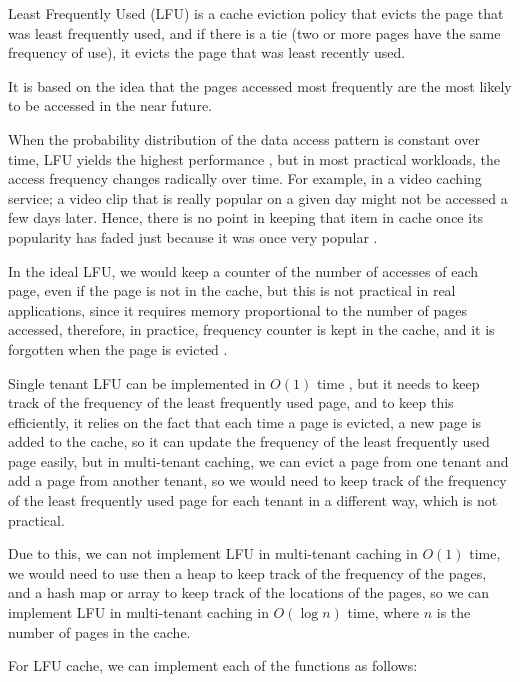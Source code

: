 Least Frequently Used (LFU) \cite{wikipedia-lfu} is a cache eviction policy that evicts
the page that was least frequently used, and if there is a tie (two or more pages have
the same frequency of use), it evicts the page that was least recently used. 
\cite{cache-management-algorithms-for-flexible-filesystems}

It is based on the idea that the pages accessed most frequently are the most likely 
to be accessed in the near future. 

When the probability distribution of the data access pattern is constant over time, LFU 
yields the highest performance \cite{lfu-highest-perf-zipf} \cite{lfu-highest-perf-inproc} \cite{tiny-lfu},
but in most practical workloads, the access frequency changes radically over time. For
example, in a video caching service; a video clip that is really popular on a 
given day might not be accessed a few days later. Hence, there is no point in 
keeping that item in cache once its popularity has faded just because it was once very 
popular \cite{tiny-lfu}.

In the ideal LFU, we would keep a counter of the number of accesses of each page,
even if the page is not in the cache, but this is not practical in real applications,
since it requires memory proportional to the number of pages accessed, therefore, in 
practice, frequency counter is kept in the cache, and it is forgotten when the page is
evicted \cite{wikipedia-lfu}.

Single tenant LFU can be implemented in $O(1)$ time \cite{o-1-lfu}, but it needs to keep
track of the frequency of the least frequently used page, and to keep this efficiently,
it relies on the fact that each time a page is evicted, a new page is added to the cache,
so it can update the frequency of the least frequently used page easily, but in multi-tenant
caching, we can evict a page from one tenant and add a page from another tenant, so we would
need to keep track of the frequency of the least frequently used page for each tenant in a
different way, which is not practical.

Due to this, we can not implement LFU in multi-tenant caching in $O(1)$ time, we would need
to use then a heap to keep track of the frequency of the pages, and a hash map or array to 
keep track of the locations of the pages, so we can implement LFU in multi-tenant caching 
in $O(\log n)$ time, where $n$ is the number of pages in the cache.

For LFU cache, we can implement each of the functions as follows:

